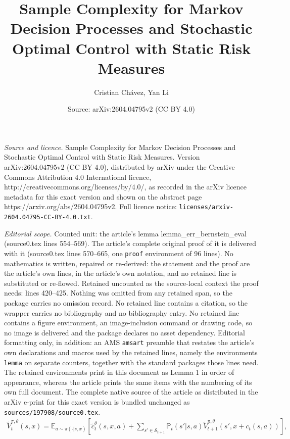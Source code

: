 \documentclass[10pt,a4paper]{amsart}
\title{Sample Complexity for Markov Decision Processes and Stochastic Optimal Control with Static Risk Measures}
\author{Cristian Ch\'avez, Yan Li}
\date{Source: arXiv:2604.04795v2 (CC BY 4.0)}
\newcommand{\EE}{\mathbb{E}}
\newcommand{\PP}{\mathbb{P}}
\newcommand{\cS}{{\mathcal{S}}}
\newcommand{\sbr}[1]{\left[#1\right]}
\newcommand\tsum{\textstyle\sum\nolimits}
\begin{document}
\maketitle

\noindent\emph{Source and licence.} Sample Complexity for Markov Decision Processes and Stochastic Optimal Control with Static Risk Measures. Version arXiv:2604.04795v2 (CC BY 4.0), distributed by arXiv under the Creative Commons Attribution 4.0 International licence, http://creativecommons.org/licenses/by/4.0/, as recorded in the arXiv licence metadata for this exact version and shown on the abstract page https://arxiv.org/abs/2604.04795v2. Full licence notice: \texttt{licenses/arxiv-2604.04795-CC-BY-4.0.txt}.\par\smallskip

\noindent\textit{Editorial scope.} Counted unit: the article's lemma lemma\_err\_bernstein\_eval (source0.tex lines 554--569). The article's complete original proof of it is delivered with it (source0.tex lines 570--665, one \texttt{proof} environment of 96 lines). No mathematics is written, repaired or re-derived: the statement and the proof are the article's own lines, in the article's own notation, and no retained line is substituted or re-flowed.  Retained uncounted as the source-local context the proof needs: lines 420--425.  Nothing was omitted from any retained span, so the package carries no omission record.  No retained line contains a citation, so the wrapper carries no bibliography and no bibliography entry.  No retained line contains a figure environment, an image-inclusion command or drawing code, so no image is delivered and the package declares no asset dependency.  Editorial formatting only, in addition: an AMS \texttt{amsart} preamble that restates the article's own declarations and macros used by the retained lines, namely the environments \texttt{lemma} on separate counters, together with the standard packages those lines need.  The retained environments print in this document as Lemma 1 in order of appearance, whereas the article prints the same items with the numbering of its own full document.  The complete native source of the article as distributed in the arXiv e-print for this exact version is bundled unchanged as \texttt{sources/197908/source0.tex}.
    \begin{align}\label{dp_finite_mdp_fix_policy}
        \tilde{V}^{\pi, \theta}_t(s, x) = \EE_{a \sim \pi(\cdot|s, x)} \sbr{
        \tilde{c}_t^\theta(s, x, a) + 
        \tsum_{s' \in \cS_{t+1}} \PP_t(s'|s, a) \tilde{V}_{t+1}^{\pi, \theta}(s', x + c_t(s, a))
        }, 
    \end{align}
\end{document}

